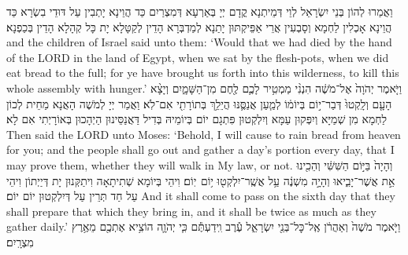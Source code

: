 {{וַאֲמַרוּ לְהוֹן בְּנֵי יִשְׂרָאֵל לְוֵי דְּמֵיתְנָא קֳדָם יְיָ בְּאַרְעָא דְּמִצְרַיִם כַּד הֲוֵינָא יָתְבִין עַל דּוּדֵי בִשְׂרָא כַּד הֲוֵינָא אָכְלִין לַחְמָא וְסָבְעִין אֲרֵי אַפֵּיקְתּוּן יָתַנָא לְמַדְבְּרָא הָדֵין לְקַטָּלָא יָת כָּל קְהָלָא הָדֵין בְּכַפְנָא׃}
{and the children of Israel said unto them: ‘Would that we had died by the hand of the LORD in the land of Egypt, when we sat by the flesh-pots, when we did eat bread to the full; for ye have brought us forth into this wilderness, to kill this whole assembly with hunger.’}{}
{וַיֹּ֤אמֶר יְהֹוָה֙ אֶל־מֹשֶׁ֔ה הִנְנִ֨י מַמְטִ֥יר לָכֶ֛ם לֶ֖חֶם מִן־הַשָּׁמָ֑יִם וְיָצָ֨א הָעָ֤ם וְלָֽקְטוּ֙ דְּבַר־י֣וֹם בְּיוֹמ֔וֹ לְמַ֧עַן אֲנַסֶּ֛נּוּ הֲיֵלֵ֥ךְ בְּתוֹרָתִ֖י אִם־לֹֽא׃
}
{וַאֲמַר יְיָ לְמֹשֶׁה הָאֲנָא מַחֵית לְכוֹן לַחְמָא מִן שְׁמַיָּא וְיִפְּקוּן עַמָּא וְיִלְקְטוּן פִּתְגָם יוֹם בְּיוֹמֵיהּ בְּדִיל דַּאֲנַסֵּינוּן הַיְהָכוּן בְּאוֹרָיְתִי אִם לָא׃}
{Then said the LORD unto Moses: ‘Behold, I will cause to rain bread from heaven for you; and the people shall go out and gather a day’s portion every day, that I may prove them, whether they will walk in My law, or not.}{}
{וְהָיָה֙ בַּיּ֣וֹם הַשִּׁשִּׁ֔י וְהֵכִ֖ינוּ אֵ֣ת אֲשֶׁר־יָבִ֑יאוּ וְהָיָ֣ה מִשְׁנֶ֔ה עַ֥ל אֲשֶֽׁר־יִלְקְט֖וּ י֥וֹם \pasek  יֽוֹם׃
}
{וִיהֵי בְּיוֹמָא שְׁתִיתָאָה וִיתַקְּנוּן יָת דְּיַיְתוֹן וִיהֵי עַל חַד תְּרֵין עַל דְּיִלְקְטוּן יוֹם יוֹם׃}
{And it shall come to pass on the sixth day that they shall prepare that which they bring in, and it shall be twice as much as they gather daily.’}{}
{וַיֹּ֤אמֶר מֹשֶׁה֙ וְאַהֲרֹ֔ן אֶֽל־כׇּל־בְּנֵ֖י יִשְׂרָאֵ֑ל עֶ֕רֶב וִֽידַעְתֶּ֕ם כִּ֧י יְהֹוָ֛ה הוֹצִ֥יא אֶתְכֶ֖ם מֵאֶ֥רֶץ מִצְרָֽיִם׃
}
}
